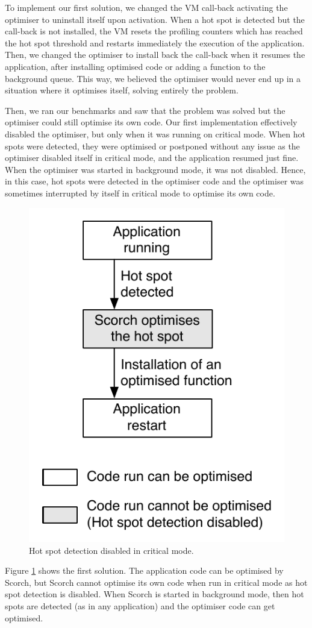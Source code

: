 \documentclass[a4paper,12pt,twoside]{../includes/ThesisStyle}
\begin{document}
To implement our first solution, we changed the VM call-back activating the optimiser to uninstall itself upon activation. When a hot spot is detected but the call-back is not installed, the VM resets the profiling counters which has reached the hot spot threshold and restarts immediately the execution of the application. Then, we changed the optimiser to install back the call-back when it resumes the application, after installing optimised code or adding a function to the background queue. This way, we believed the optimiser would never end up in a situation where it optimises itself, solving entirely the problem.

Then, we ran our benchmarks and saw that the problem was solved but the optimiser could still optimise its own code. Our first implementation effectively disabled the optimiser, but only when it was running on critical mode. When hot spots were detected, they were optimised or postponed without any issue as the optimiser disabled itself in critical mode, and the application resumed just fine. When the optimiser was started in background mode, it was not disabled. Hence, in this case, hot spots were detected in the optimiser code and the optimiser was sometimes interrupted by itself in critical mode to optimise its own code.

\begin{figure}[h!]
    \begin{center}
        \includegraphics[width=0.4\linewidth]{Disabling}
        \caption{Hot spot detection disabled in critical mode.}
        \label{fig:Disabling}
    \end{center}
\end{figure}

Figure \ref{fig:Disabling} shows the first solution. The application code can be optimised by Scorch, but Scorch cannot optimise its own code when run in critical mode as hot spot detection is disabled. When Scorch is started in background mode, then hot spots are detected (as in any application) and the optimiser code can get optimised.
\end{document}
